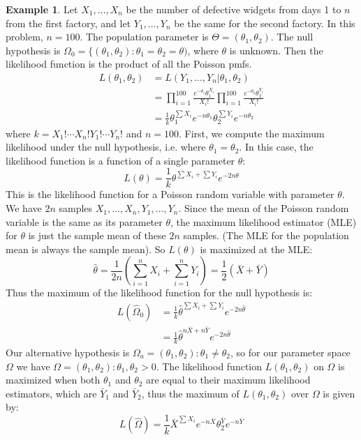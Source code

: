 \documentclass[12pt]{article}
\theoremstyle{definition}
\newtheorem*{example}{Example}
\theoremstyle{remark}
\begin{document}
\begin{example}
Let $X_1, \dots, X_n$ be the number of defective widgets from days 1 to $n$ from the first factory, and let $Y_1, \dots, Y_n$ be the same for the second factory. In this problem, $n = 100$. The population parameter is $\Theta = (\theta_1, \theta_2)$. The null hypothesis is $\Omega_0 = \{(\theta_1, \theta_2) : \theta_1 = \theta_2 = \theta)$, where $\theta$ is unknown. Then the likelihood function is the product of all the Poisson pmfs.
\begin{align*}
L(\theta_1, \theta_2) &= L(Y_1, \dots, Y_n|\theta_1, \theta_2)\\
&= \prod_{i=1}^{100} \frac{ e^{-\theta_1} \theta_1^{X_i}}{X_i!}\prod_{i=1}^{100} \frac{ e^{-\theta_2} \theta_2^{Y_i}}{X_i!}\\
&= \frac{1}{k} \theta_1^{\sum X_i} e^{-n \theta_1} \theta_2^{\sum Y_i} e^{-n \theta_2}
\end{align*}
where $k = X_1! \cdots X_n! Y_1! \cdots Y_n!$ and $n = 100$. First, we compute the maximum likelihood under the null hypothesis, i.e. where $\theta_1 = \theta_2$. In this case, the likelihood function is a function of a single parameter $\theta$:
\[
L(\theta) = \frac{1}{k} \theta^{\sum X_i + \sum Y_i} e^{-2 n \theta}
\]
This is the likelihood function for a Poisson random variable with parameter $\theta$. We have $2n$ samples $X_1, \dots, X_n, Y_1, \dots, Y_n$. Since the mean of the Poisson random variable is the same as its parameter $\theta$, the maximum likelihood estimator (MLE) for $\theta$ is just the sample mean of these $2n$ samples. (The MLE for the population mean is always the sample mean). So $L(\theta)$ is maximized at the MLE:
\[
\hat{\theta} = \frac{1}{2n}\left( \sum_{i=1}^{n} X_i + \sum_{i=1}^{n} Y_i \right) = \frac{1}{2}(\bar{X} + \bar{Y})
\]
Thus the maximum of the likelihood function for the null hypothesis is:
\begin{align*}
L(\hat{\Omega}_0) &= \frac{1}{k} \hat{\theta}^{\sum X_i + \sum Y_i} e^{-2 n \hat{\theta}} \\
&= \frac{1}{k} \hat{\theta}^{n\bar{X} + n\bar{Y}} e^{-2 n \hat{\theta}}
\end{align*}
Our alternative hypothesis is $\Omega_a = (\theta_1, \theta_2) : \theta_1 \neq \theta_2$, so for our parameter space $\Omega$ we have $\Omega = (\theta_1, \theta_2) : \theta_1, \theta_2 > 0$. The likelihood function $L(\theta_1, \theta_2)$ on $\Omega$ is maximized when both $\theta_1$ and $\theta_2$ are equal to their maximum likelihood estimators, which are $\bar{Y}_1$ and $\bar{Y}_2$, thus the maximum of $L(\theta_1, \theta_2)$ over $\Omega$ is given by:
\[
L(\hat{\Omega}) = \frac{1}{k} \bar{X}^{\sum X_i} e^{-n \bar{X}} \theta_2^{\bar{Y}} e^{-n \bar{Y}}
\]
\end{example}
\end{document}
